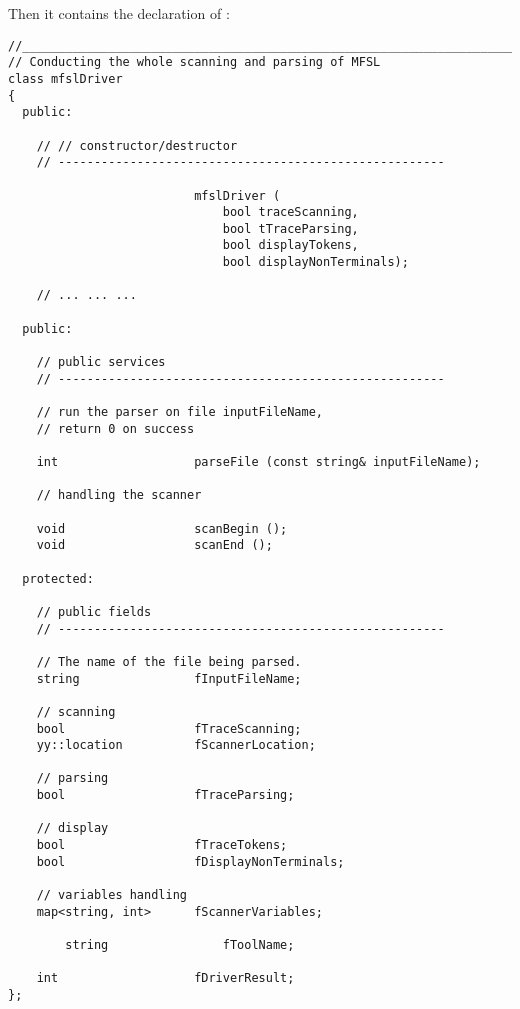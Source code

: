 Then it contains the declaration of :
\begin{lstlisting}[language=CPlusPlus]
//______________________________________________________________________________
// Conducting the whole scanning and parsing of MFSL
class mfslDriver
{
  public:

    // // constructor/destructor
    // ------------------------------------------------------

                          mfslDriver (
                              bool traceScanning,
                              bool tTraceParsing,
                              bool displayTokens,
                              bool displayNonTerminals);

	// ... ... ...

  public:

    // public services
    // ------------------------------------------------------

    // run the parser on file inputFileName,
    // return 0 on success

    int                   parseFile (const string& inputFileName);

    // handling the scanner

    void                  scanBegin ();
    void                  scanEnd ();

  protected:

    // public fields
    // ------------------------------------------------------

    // The name of the file being parsed.
    string                fInputFileName;

    // scanning
    bool                  fTraceScanning;
    yy::location          fScannerLocation;

    // parsing
    bool                  fTraceParsing;

    // display
    bool                  fTraceTokens;
    bool                  fDisplayNonTerminals;

    // variables handling
    map<string, int>      fScannerVariables;

		string                fToolName;

    int                   fDriverResult;
};
\end{lstlisting}

